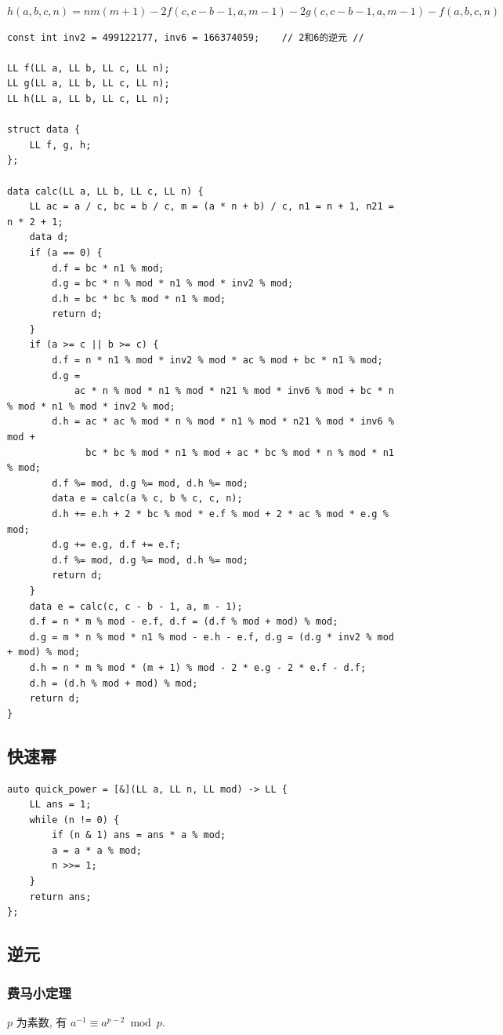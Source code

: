 \documentclass[UTF8, a4paper, titlepage, twoside]{ctexart}
\begin{document}
$h(a, b, c, n) = nm(m+1)-2f(c, c - b-1, a, m- 1)-2g(c,c-b-1,a,m-1)-f(a, b, c, n)$
\begin{lstlisting}
const int inv2 = 499122177, inv6 = 166374059;    // 2和6的逆元 //

LL f(LL a, LL b, LL c, LL n);
LL g(LL a, LL b, LL c, LL n);
LL h(LL a, LL b, LL c, LL n);

struct data {
    LL f, g, h;
};

data calc(LL a, LL b, LL c, LL n) {
    LL ac = a / c, bc = b / c, m = (a * n + b) / c, n1 = n + 1, n21 = n * 2 + 1;
    data d;
    if (a == 0) {
        d.f = bc * n1 % mod;
        d.g = bc * n % mod * n1 % mod * inv2 % mod;
        d.h = bc * bc % mod * n1 % mod;
        return d;
    }
    if (a >= c || b >= c) {
        d.f = n * n1 % mod * inv2 % mod * ac % mod + bc * n1 % mod;
        d.g =
            ac * n % mod * n1 % mod * n21 % mod * inv6 % mod + bc * n % mod * n1 % mod * inv2 % mod;
        d.h = ac * ac % mod * n % mod * n1 % mod * n21 % mod * inv6 % mod +
              bc * bc % mod * n1 % mod + ac * bc % mod * n % mod * n1 % mod;
        d.f %= mod, d.g %= mod, d.h %= mod;
        data e = calc(a % c, b % c, c, n);
        d.h += e.h + 2 * bc % mod * e.f % mod + 2 * ac % mod * e.g % mod;
        d.g += e.g, d.f += e.f;
        d.f %= mod, d.g %= mod, d.h %= mod;
        return d;
    }
    data e = calc(c, c - b - 1, a, m - 1);
    d.f = n * m % mod - e.f, d.f = (d.f % mod + mod) % mod;
    d.g = m * n % mod * n1 % mod - e.h - e.f, d.g = (d.g * inv2 % mod + mod) % mod;
    d.h = n * m % mod * (m + 1) % mod - 2 * e.g - 2 * e.f - d.f;
    d.h = (d.h % mod + mod) % mod;
    return d;
}
\end{lstlisting}

\subsection{ 快速幂 }
\begin{lstlisting}
auto quick_power = [&](LL a, LL n, LL mod) -> LL {
    LL ans = 1;
    while (n != 0) {
        if (n & 1) ans = ans * a % mod;
        a = a * a % mod;
        n >>= 1;
    }
    return ans;
};
\end{lstlisting}

\subsection{ 逆元 }
\subsubsection{ 费马小定理 }
$p$ 为素数, 有 $a ^ {-1}\equiv a^{p-2}\bmod p$.
\end{document}
